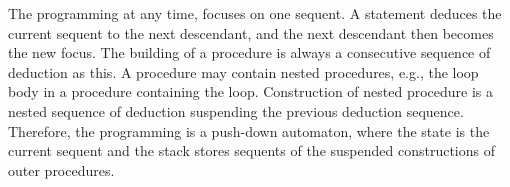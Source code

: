 The programming at any time, focuses on one sequent.
A statement deduces the current sequent to the next descendant, and the next descendant then becomes
the new focus.
The building of a procedure is always a consecutive sequence of deduction as this.
A procedure may contain nested procedures, e.g., the loop body in a procedure containing the loop.
Construction of nested procedure is a nested sequence of deduction suspending the previous deduction
sequence.
Therefore, the programming is a push-down automaton, where the state is the current sequent and the
stack stores sequents of the suspended constructions of outer procedures.

%
%

